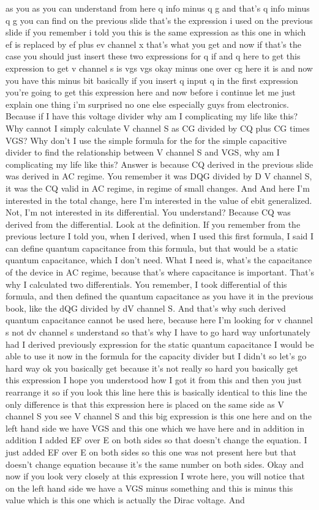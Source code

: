 as you as you can understand from here q info minus q g and that's q info minus q g you can find on the previous slide that's the expression i used on the previous slide if you remember i told you this is the same expression as this one in which ef is replaced by ef plus ev channel x that's what you get and now if that's the case you should just insert these two expressions for q if and q here to get this expression to get v channel s is vgs vgs okay minus one over cg here it is and now you have this minus bit basically if you insert q input q in the first expression you're going to get this expression here and now before i continue let me just explain one thing i'm surprised no one else especially guys from electronics. Because if I have this voltage divider why am I complicating my life like this? Why cannot I simply calculate V channel S as CG divided by CQ plus CG times VGS? Why don't I use the simple formula for the for the simple capacitive divider to find the relationship between V channel S and VGS, why am I complicating my life like this? Answer is because CQ derived in the previous slide was derived in AC regime. You remember it was DQG divided by D V channel S, it was the CQ valid in AC regime, in regime of small changes. And And here I'm interested in the total change, here I'm interested in the value of ebit generalized. Not, I'm not interested in its differential. You understand? Because CQ was derived from the differential. Look at the definition. If you remember from the previous lecture I told you, when I derived, when I used this first formula, I said I can define quantum capacitance from this formula, but that would be a static quantum capacitance, which I don't need. What I need is, what's the capacitance of the device in AC regime, because that's where capacitance is important. That's why I calculated two differentials. You remember, I took differential of this formula, and then defined the quantum capacitance as you have it in the previous book, like the dQG divided by dV channel S. And that's why such derived quantum capacitance cannot be used here, because here I'm looking for v channel s not dv channel s understand so that's why I have to go hard way unfortunately had I derived previously expression for the static quantum capacitance I would be able to use it now in the formula for the capacity divider but I didn't so let's go hard way ok you basically get because it's not really so hard you basically get this expression I hope you understood how I got it from this and then you just rearrange it so if you look this line here this is basically identical to this line the only difference is that this expression here is placed on the same side as V channel S you see V channel S and this big expression is this one here and on the left hand side we have VGS and this one which we have here and in addition in addition I added EF over E on both sides so that doesn't change the equation. I just added EF over E on both sides so this one was not present here but that doesn't change equation because it's the same number on both sides. Okay and now if you look very closely at this expression I wrote here, you will notice that on the left hand side we have a VGS minus something and this is minus this value which is this one which is actually the Dirac voltage. And 